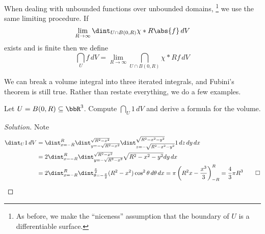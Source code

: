   When dealing with unbounded functions over unbounded domains,%
  \footnote{%
    As before, we make the ``niceness'' assumption that the boundary of $U$ is a 
differentiable surface.
  }
  we use the same limiting procedure.
  If
  \begin{equation*}
    \lim_{R \to \infty} \dint_{U \cap B(0, R)} \chi*R \abs{f} \, dV
  \end{equation*}
  exists and is finite then we define
  \begin{equation*}
    \dint_U f \, dV = \lim_{R \to \infty} \dint_{U \cap B(0, R)} \chi*R f \, dV
  \end{equation*}

  We can break a volume integral into three iterated integrals, and Fubini's 
theorem is still true.
  Rather than restate everything, we do a few examples.

  \begin{example}
    Let $U = B(0, R) \subseteq \bbR^3$.
    Compute $\dint_U 1 \, dV$ and derive a formula for the volume.
  \end{example}
  \begin{proof}[Solution]
    Note
    \begin{align}
      \dint_U 1 \, dV
	&= \dint_{x = -R}^R \dint_{y = -\sqrt{R^2 - x^2}}^{\sqrt{R^2 - x^2}} 
\dint_{z = -\sqrt{R^2 - x^2 - y^2}}^{\sqrt{R^2 - x^2 - y^2}} 1 \, dz \, dy \, dx
	\\
	&= 2 \dint_{x = -R}^R \dint_{y = -\sqrt{R^2 - x^2}}^{\sqrt{R^2 - x^2}} 
\sqrt{R^2 - x^2 - y^2} dy \, dx
	\\
	&= 2 \dint_{x = -R}^R \dint_{\theta = -\frac{\pi}{2}}^{\frac{\pi}{2}} 
(R^2 - x^2)\cos^2 \theta \, d\theta \, dx
	= \pi \left(R^2 x - \frac{x^3}{3} \right)_{-R}^R
	= \frac{4}{3} \pi R^3
	\qed
    \end{align}
  \end{proof}

